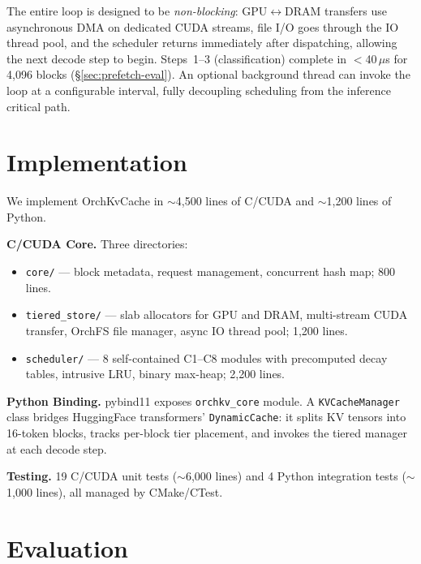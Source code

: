 \documentclass[conference]{IEEEtran}
\begin{document}
The entire loop is designed to be \emph{non-blocking}: GPU$\leftrightarrow$DRAM transfers use asynchronous DMA on dedicated CUDA streams, file I/O goes through the IO thread pool, and the scheduler returns immediately after dispatching, allowing the next decode step to begin. Steps~1--3 (classification) complete in $<$40\,$\mu$s for 4,096 blocks (\S\ref{sec:prefetch-eval}). An optional background thread can invoke the loop at a configurable interval, fully decoupling scheduling from the inference critical path.


\section{Implementation}

We implement OrchKvCache in ${\sim}$4,500 lines of C/CUDA and ${\sim}$1,200 lines of Python.

\textbf{C/CUDA Core.} Three directories:
\begin{itemize}
\item \texttt{core/} --- block metadata, request management, concurrent hash map; 800 lines.
\item \texttt{tiered\_store/} --- slab allocators for GPU and DRAM, multi-stream CUDA transfer, OrchFS file manager, async IO thread pool; 1,200 lines.
\item \texttt{scheduler/} --- 8 self-contained C1--C8 modules with precomputed decay tables, intrusive LRU, binary max-heap; 2,200 lines.
\end{itemize}

\textbf{Python Binding.} pybind11 exposes \texttt{orchkv\_core} module. A \texttt{KVCacheManager} class bridges HuggingFace transformers' \texttt{DynamicCache}: it splits KV tensors into 16-token blocks, tracks per-block tier placement, and invokes the tiered manager at each decode step.

\textbf{Testing.} 19 C/CUDA unit tests (${\sim}$6,000 lines) and 4 Python integration tests (${\sim}$1,000 lines), all managed by CMake/CTest.

\section{Evaluation}
\end{document}
